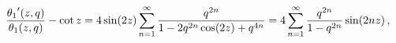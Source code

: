 \[\frac{\mathop{\theta_{1}\/}\nolimits'\!\left(z,q\right)}{\mathop{\theta_{1}\/}%
\nolimits\!\left(z,q\right)}-\mathop{\cot\/}\nolimits z=4\mathop{\sin\/}%
\nolimits\!\left(2z\right)\sum_{n=1}^{\infty}\frac{q^{2n}}{1-2q^{2n}\mathop{%
\cos\/}\nolimits\!\left(2z\right)+q^{4n}}=4\sum_{n=1}^{\infty}\frac{q^{2n}}{1-%
q^{2n}}\mathop{\sin\/}\nolimits\!\left(2nz\right),\]